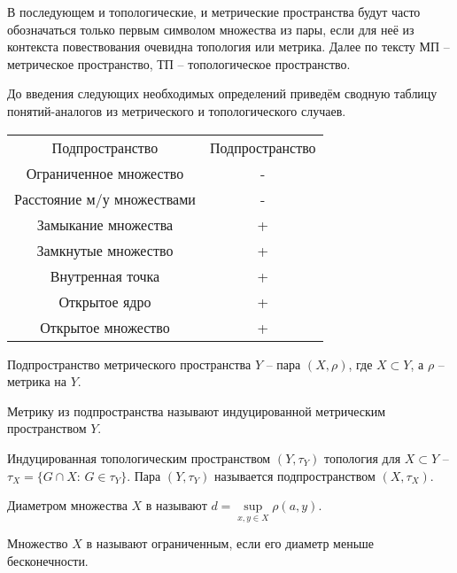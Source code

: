 В последующем и топологические, и метрические пространства будут часто обозначаться только первым символом множества из пары, если для неё из контекста повествования очевидна
 топология или метрика. Далее по тексту МП -- метрическое пространство, ТП -- топологическое пространство.

До введения следующих необходимых определений приведём сводную таблицу понятий-аналогов из метрического и топологического случаев.

\begin{center}
\begin{tabular}{ |c|c| }
    Подпространство & Подпространство \\
    Ограниченное множество & - \\
    Расстояние м/у множествами & - \\
    Замыкание множества & + \\
    Замкнутые множество & + \\
    Внутренная точка & + \\
    Открытое ядро & + \\
    Открытое множество & + \\

    
\end{tabular}
\end{center}

\begin{Def}
    Подпространство метрического пространства $Y$ -- пара $(X, \rho)$, где $X \subset Y$, а $\rho$ -- метрика на $Y$.
\end{Def}

Метрику из подпространства называют индуцированной метрическим пространством $Y$.

\begin{Def}
    Индуцированная топологическим пространством $\left( Y, \tau_Y \right)$ топология для $X \subset Y$ -- $\tau_X = \{ G \cap X :\, G \in \tau_Y \}$.
    Пара $(Y, \tau_Y)$ называется подпространством $\left(X, \tau_X \right)$.
\end{Def}

\begin{Def}
    Диаметром множества $X$ в \MS называют $d = \sup\limits_{x, y \in X} \rho(a, y)$.
\end{Def}

\begin{Def}
    Множество $X$ в \MS называют ограниченным, если его диаметр меньше бесконечности.
\end{Def}

